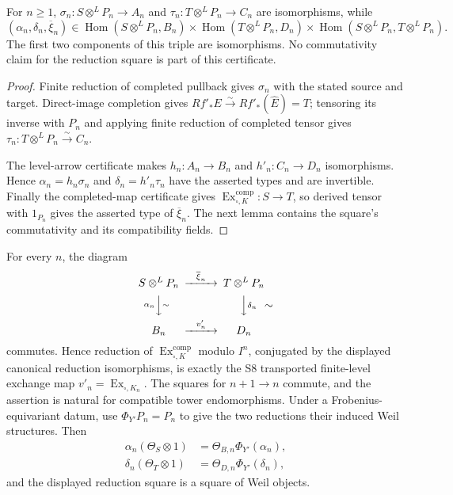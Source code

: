 \begin{lemma}
\label{lemma:weil-sf-well-defined-def-weil-pbc-completed-reduction-square}
For $n\geq1$, $\sigma_n:S\otimes^LP_n\to A_n$ and
$\tau_n:T\otimes^LP_n\to C_n$ are isomorphisms, while
\[
 (\alpha_n,\delta_n,\overline\xi_n)\in
 \operatorname{Hom}(S\otimes^LP_n,B_n)\times
 \operatorname{Hom}(T\otimes^LP_n,D_n)\times
 \operatorname{Hom}(S\otimes^LP_n,T\otimes^LP_n).
\]
The first two components of this triple are isomorphisms.  No commutativity
claim for the reduction square is part of this certificate.
\end{lemma}
\begin{proof}
Finite reduction of completed pullback gives $\sigma_n$ with the stated
source and target.  Direct-image completion gives
$\widehat{Rf'_*E}\xrightarrow{\sim}Rf'_*(\widehat E)=T$; tensoring its
inverse with $P_n$ and applying finite reduction of completed tensor gives
$\tau_n:T\otimes^LP_n\xrightarrow{\sim}C_n$.

The level-arrow certificate makes $h_n:A_n\to B_n$ and
$h'_n:C_n\to D_n$ isomorphisms.  Hence
$\alpha_n=h_n\sigma_n$ and $\delta_n=h'_n\tau_n$ have the asserted types
and are invertible.  Finally the completed-map certificate gives
$\operatorname{Ex}^{\mathrm{comp}}_{\square,K}:S\to T$, so derived tensor
with $1_{P_n}$ gives the asserted type of $\overline\xi_n$.  The next lemma
contains the square's commutativity and its compatibility fields.
\end{proof}
\begin{lemma}
\label{lemma:weil-pbc-completed-map-reduction}
For every $n$, the diagram
\[
\begin{CD}
 S\otimes^LP_n @>{\overline\xi_n}>> T\otimes^LP_n\\
 @V{\alpha_n}V{\sim}V @VV{\delta_n}V{\sim}\\
 B_n @>{v'_n}>> D_n
\end{CD}
\]
commutes.  Hence reduction of
$\operatorname{Ex}^{\mathrm{comp}}_{\square,K}$ modulo $I^n$, conjugated
by the displayed canonical reduction isomorphisms, is exactly the S8
transported finite-level exchange map $v'_n=\operatorname{Ex}_{\square,K_n}$.
The squares for $n+1\to n$ commute, and the assertion is natural for
compatible tower endomorphisms.  Under a Frobenius-equivariant datum, use
$\Phi_{Y'}P_n=P_n$ to give the two reductions their induced Weil structures.
Then
\[
\begin{aligned}
 \alpha_n(\Theta_S\otimes1)
 &=\Theta_{B,n}\Phi_{Y'}(\alpha_n),\\
 \delta_n(\Theta_T\otimes1)
 &=\Theta_{D,n}\Phi_{Y'}(\delta_n),
\end{aligned}
\]
and the displayed reduction square is a square of Weil objects.
\end{lemma}
